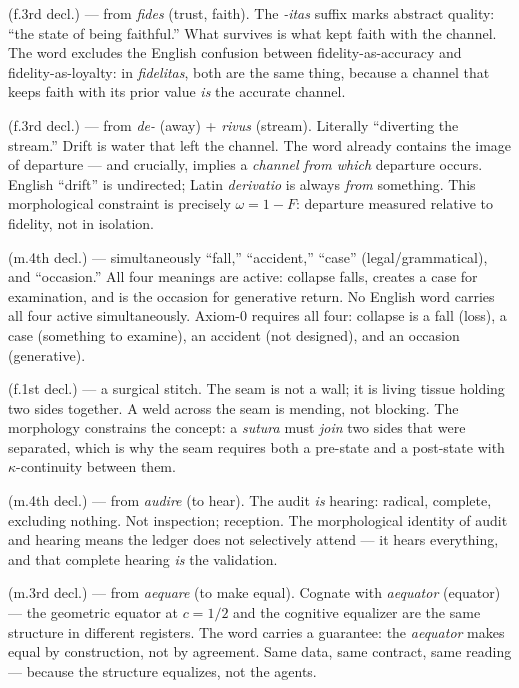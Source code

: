 \documentclass[
  aps,
  prd,
  twocolumn,
  superscriptaddress,
  nofootinbib,
  floatfix
]{revtex4-2}
\newcommand{\Fid}{F}
\newcommand{\Drft}{\omega}
\newcommand{\Logint}{\kappa}
\newcommand{\lat}[1]{\textit{#1}}
\begin{document}
\begin{description}[nosep,leftmargin=0pt,labelindent=0pt]
\item[\lat{Fidelitas}] (f.\@ 3rd decl.) --- from \lat{fides}
  (trust, faith). The \lat{-itas} suffix marks abstract quality:
  ``the state of being faithful.'' What survives is what kept
  faith with the channel. The word excludes the English confusion
  between fidelity-as-accuracy and fidelity-as-loyalty: in
  \lat{fidelitas}, both are the same thing, because a channel
  that keeps faith with its prior value \emph{is} the accurate
  channel.
\item[\lat{Derivatio}] (f.\@ 3rd decl.) --- from \lat{de-}
  (away) + \lat{rivus} (stream). Literally ``diverting the
  stream.'' Drift is water that left the channel. The word
  already contains the image of departure --- and crucially,
  implies a \emph{channel from which} departure occurs. English
  ``drift'' is undirected; Latin \lat{derivatio} is always
  \emph{from} something. This morphological constraint is
  precisely $\Drft = 1 - \Fid$: departure measured relative
  to fidelity, not in isolation.
\item[\lat{Casus}] (m.\@ 4th decl.) --- simultaneously
  ``fall,'' ``accident,'' ``case'' (legal/grammatical), and
  ``occasion.'' All four meanings are active: collapse falls,
  creates a case for examination, and is the occasion for
  generative return. No English word carries all four active
  simultaneously. Axiom-0 requires all four: collapse is a
  fall (loss), a case (something to examine), an accident
  (not designed), and an occasion (generative).
\item[\lat{Sutura}] (f.\@ 1st decl.) --- a surgical stitch.
  The seam is not a wall; it is living tissue holding two sides
  together. A weld across the seam is mending, not blocking.
  The morphology constrains the concept: a \lat{sutura} must
  \emph{join} two sides that were separated, which is why the
  seam requires both a pre-state and a post-state with
  $\Logint$-continuity between them.
\item[\lat{Auditus}] (m.\@ 4th decl.) --- from \lat{audire}
  (to hear). The audit \emph{is} hearing: radical, complete,
  excluding nothing. Not inspection; reception. The morphological
  identity of audit and hearing means the ledger does not
  selectively attend --- it hears everything, and that complete
  hearing \emph{is} the validation.
\item[\lat{Aequator}] (m.\@ 3rd decl.) --- from \lat{aequare}
  (to make equal). Cognate with \lat{aequator} (equator) ---
  the geometric equator at $c = 1/2$ and the cognitive equalizer
  are the same structure in different registers. The word carries
  a guarantee: the \lat{aequator} makes equal by construction,
  not by agreement. Same data, same contract, same reading ---
  because the structure equalizes, not the agents.
\end{description}
\end{document}
